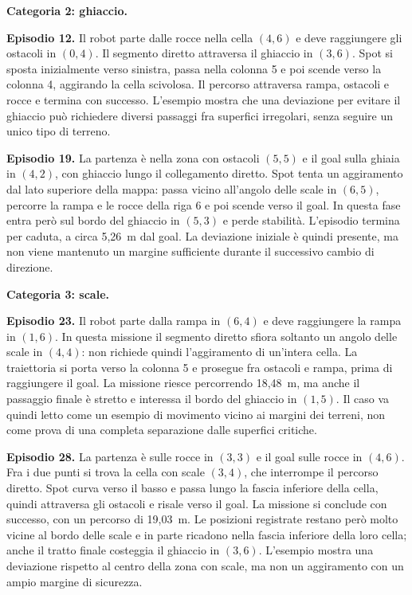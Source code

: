 \documentclass[11pt,a4paper]{article}
\begin{document}
\textbf{Categoria 2: ghiaccio.}

\textbf{Episodio 12.} Il robot parte dalle rocce nella cella $(4,6)$ e deve raggiungere gli ostacoli in $(0,4)$. Il segmento diretto attraversa il ghiaccio in $(3,6)$. Spot si sposta inizialmente verso sinistra, passa nella colonna 5 e poi scende verso la colonna 4, aggirando la cella scivolosa. Il percorso attraversa rampa, ostacoli e rocce e termina con successo. L'esempio mostra che una deviazione per evitare il ghiaccio può richiedere diversi passaggi fra superfici irregolari, senza seguire un unico tipo di terreno.

\textbf{Episodio 19.} La partenza è nella zona con ostacoli $(5,5)$ e il goal sulla ghiaia in $(4,2)$, con ghiaccio lungo il collegamento diretto. Spot tenta un aggiramento dal lato superiore della mappa: passa vicino all'angolo delle scale in $(6,5)$, percorre la rampa e le rocce della riga 6 e poi scende verso il goal. In questa fase entra però sul bordo del ghiaccio in $(5,3)$ e perde stabilità. L'episodio termina per caduta, a circa 5,26~m dal goal. La deviazione iniziale è quindi presente, ma non viene mantenuto un margine sufficiente durante il successivo cambio di direzione.

\textbf{Categoria 3: scale.}

\textbf{Episodio 23.} Il robot parte dalla rampa in $(6,4)$ e deve raggiungere la rampa in $(1,6)$. In questa missione il segmento diretto sfiora soltanto un angolo delle scale in $(4,4)$: non richiede quindi l'aggiramento di un'intera cella. La traiettoria si porta verso la colonna 5 e prosegue fra ostacoli e rampa, prima di raggiungere il goal. La missione riesce percorrendo 18,48~m, ma anche il passaggio finale è stretto e interessa il bordo del ghiaccio in $(1,5)$. Il caso va quindi letto come un esempio di movimento vicino ai margini dei terreni, non come prova di una completa separazione dalle superfici critiche.

\textbf{Episodio 28.} La partenza è sulle rocce in $(3,3)$ e il goal sulle rocce in $(4,6)$. Fra i due punti si trova la cella con scale $(3,4)$, che interrompe il percorso diretto. Spot curva verso il basso e passa lungo la fascia inferiore della cella, quindi attraversa gli ostacoli e risale verso il goal. La missione si conclude con successo, con un percorso di 19,03~m. Le posizioni registrate restano però molto vicine al bordo delle scale e in parte ricadono nella fascia inferiore della loro cella; anche il tratto finale costeggia il ghiaccio in $(3,6)$. L'esempio mostra una deviazione rispetto al centro della zona con scale, ma non un aggiramento con un ampio margine di sicurezza.
\end{document}
